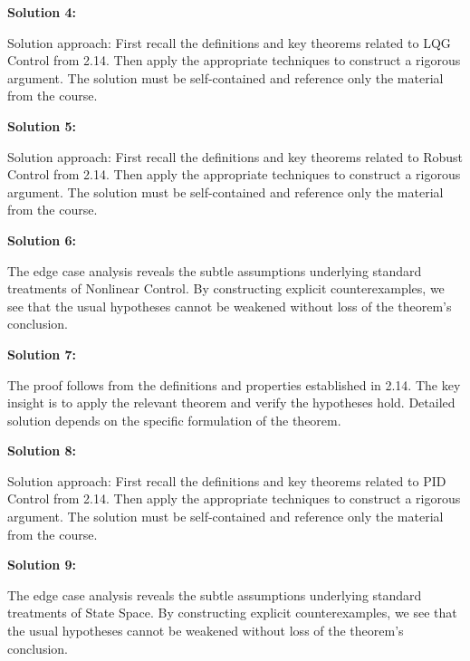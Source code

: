 \documentclass[12pt,a4paper]{exam}
\begin{document}
\vspace{0.5cm}

\textbf{Solution 4:}

Solution approach: First recall the definitions and key theorems related to LQG Control from 2.14. Then apply the appropriate techniques to construct a rigorous argument. The solution must be self-contained and reference only the material from the course.

\vspace{0.5cm}

\textbf{Solution 5:}

Solution approach: First recall the definitions and key theorems related to Robust Control from 2.14. Then apply the appropriate techniques to construct a rigorous argument. The solution must be self-contained and reference only the material from the course.

\vspace{0.5cm}

\textbf{Solution 6:}

The edge case analysis reveals the subtle assumptions underlying standard treatments of Nonlinear Control. By constructing explicit counterexamples, we see that the usual hypotheses cannot be weakened without loss of the theorem's conclusion.

\vspace{0.5cm}

\textbf{Solution 7:}

The proof follows from the definitions and properties established in 2.14. The key insight is to apply the relevant theorem and verify the hypotheses hold. Detailed solution depends on the specific formulation of the theorem.

\vspace{0.5cm}

\textbf{Solution 8:}

Solution approach: First recall the definitions and key theorems related to PID Control from 2.14. Then apply the appropriate techniques to construct a rigorous argument. The solution must be self-contained and reference only the material from the course.

\vspace{0.5cm}

\textbf{Solution 9:}

The edge case analysis reveals the subtle assumptions underlying standard treatments of State Space. By constructing explicit counterexamples, we see that the usual hypotheses cannot be weakened without loss of the theorem's conclusion.
\end{document}
